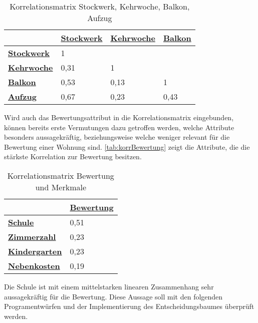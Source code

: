 \useunder{\uline}{\ul}{}
\begin{table}[h]
    \begin{center}
        \begin{tabular}{|l|l|l|l|}
        \hline
            {\ul \textbf{}}              & {\ul \textbf{Stockwerk}} & {\ul \textbf{Kehrwoche}}  & {\ul \textbf{Balkon}} \\ \hline
            {\ul \textbf{Stockwerk}}     & 1                        &                           &                       \\ \hline
            {\ul \textbf{Kehrwoche}}     & 0,31                     & 1                         &                       \\ \hline
            {\ul \textbf{Balkon}}        & 0,53                     & 0,13                      & 1                     \\ \hline
            {\ul \textbf{Aufzug}}        & 0,67                     & 0,23                      & 0,43                  \\ \hline
        \end{tabular}
        \caption{Korrelationsmatrix Stockwerk, Kehrwoche, Balkon, Aufzug}
        \label{tab:korr2}
    \end{center}
\end{table}
 
Wird auch das Bewertungsattribut in die Korrelationsmatrix eingebunden, können bereits erste Vermutungen dazu getroffen werden, 
welche Attribute besonders aussagekräftig, beziehungsweise welche weniger relevant für die Bewertung einer Wohnung sind. 
\autoref{tab:korrBewertung} zeigt die Attribute, die die stärkste Korrelation zur Bewertung besitzen.
\useunder{\uline}{\ul}{}
\begin{table}[h]
    \begin{center}
        \begin{tabular}{|l|l|}
            \hline
            {\ul \textbf{}}              & {\ul \textbf{Bewertung}} \\ \hline
            {\ul \textbf{Schule}}        & 0,51                        \\ \hline
            {\ul \textbf{Zimmerzahl}}    & 0,23                     \\ \hline
            {\ul \textbf{Kindergarten}}  & 0,23                     \\ \hline
            {\ul \textbf{Nebenkosten}}   & 0,19                     \\ \hline
        \end{tabular}
        \caption{Korrelationsmatrix Bewertung und Merkmale}
        \label{tab:korrBewertung}
    \end{center}
\end{table}

Die Schule ist mit einem mittelstarken linearen Zusammenhang sehr aussagekräftig für die Bewertung.
Diese Aussage soll mit den folgenden Programentwürfen und der Implementierung des Entscheidungsbaumes
überprüft werden. 